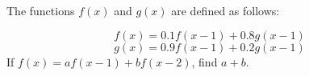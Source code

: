 The functions $f(x)$ and $g(x)$ are defined as follows:

\[f(x) = 0.1f(x - 1) + 0.8g(x - 1)\]\[g(x) = 0.9f(x - 1) + 0.2g(x - 1)\]If $f(x) = af(x - 1) + bf(x - 2)$, find $a + b$.
